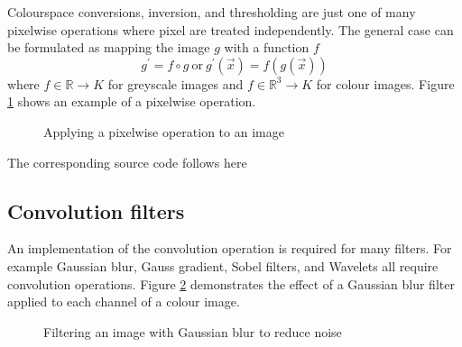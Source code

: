 \documentclass[a4paper,12pt]{book}
\begin{document}
Colourspace conversions, inversion, and thresholding are just one of many
pixelwise operations where pixel are treated independently. The general case
can be formulated as mapping the image $g$ with a function $f$
\begin{equation*}
  g^\prime=f\circ g\mathrm{\ or\ }g^\prime(\vec{x})=f(g(\vec{x}))
\end{equation*}
where $f\in\mathbb{R}\to K$ for greyscale images and
$f\in\mathbb{R}^3\to K$ for colour images. Figure \ref{fig:pixelwise} shows
an example of a pixelwise operation.
\begin{figure}[htbp]
   \begin{center}
     \begin{minipage}[c]{.45\textwidth}
     \end{minipage}
     \begin{minipage}[c]{.45\textwidth}
     \end{minipage}
     \caption{Applying a pixelwise operation to an image\label{fig:pixelwise}}
   \end{center}
\end{figure}
The corresponding source code follows here
\begin{scriptsize}
  
\end{scriptsize}

\subsection{Convolution filters}
An implementation of the convolution operation is required for many
filters. For example Gaussian blur, Gauss gradient, Sobel filters, and
Wavelets all require convolution operations. Figure \ref{fig:gaussian}
demonstrates the effect of a Gaussian blur filter applied to each channel
of a colour image.
\begin{figure}[htbp]
   \begin{center}
     \begin{minipage}[c]{.45\textwidth}
     \end{minipage}
     \begin{minipage}[c]{.45\textwidth}
     \end{minipage}
     \caption{Filtering an image with Gaussian blur to reduce noise\label{fig:gaussian}}
   \end{center}
\end{figure}
\end{document}
